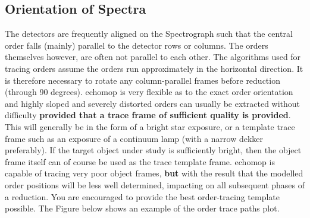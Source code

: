 \documentclass[11pt,twoside]{article}
\newcommand{\xlabel}[1]{}
\newcommand{\mlabel}[1]{\xlabel{#1}\label{#1}}
\newcommand{\sunspec}[2]{#1}
\renewcommand{\sunspec}[2]{#2}
\newcommand{\myindex}[1]{\index{#1}}
\renewcommand{\myindex}[1]{}
\begin{document}
\subsection{\mlabel{orientation}Orientation of Spectra}
\myindex{Orientation of spectra}

The detectors are frequently aligned on the Spectrograph such that the
central order falls (mainly) parallel to the detector rows or columns.
The orders themselves however, are often not parallel to each other.
The algorithms used for tracing orders assume the orders run
approximately in the horizontal direction.  It is therefore necessary to
rotate any column-parallel frames before reduction (through 90 degrees).
\myindex{Frame!rotation} {\sc echomop} is very flexible as to the exact
order orientation and highly sloped and severely distorted orders can
usually be extracted without difficulty {\bf provided that a trace
frame of sufficient quality is provided}.  This will generally be in the
form of a bright star exposure, or a template trace frame such as an
exposure of a continuum lamp (with a narrow dekker preferably).
\myindex{Tracing} \myindex{Trace!frame} If the target object under study is
sufficiently bright, then the object frame itself can of course be used
as the trace template frame.  {\sc echomop} is capable of tracing very poor
object frames, {\bf but} with the result that the modelled order positions
will be less well determined, impacting on all subsequent phases of a
reduction.   You are encouraged to provide the best
order-tracing template possible. \sunspec{Figure~\ref{fi_order}}{The Figure
below} shows an example of the order trace paths plot.
\end{document}

